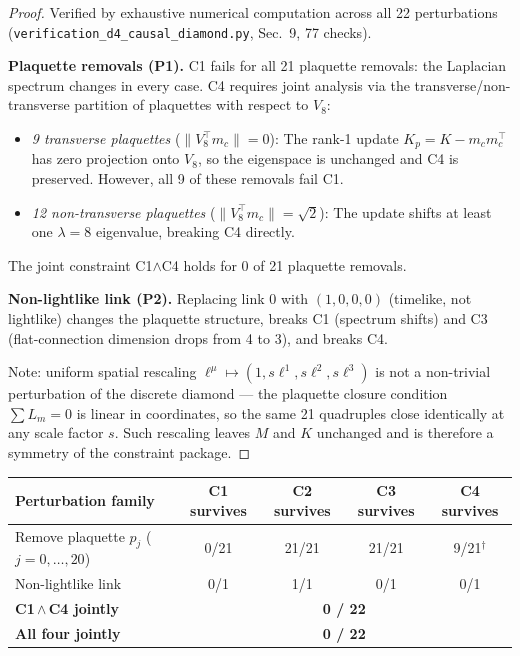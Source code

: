 \documentclass[12pt,a4paper]{article}
\theoremstyle{plain}
\theoremstyle{definition}
\begin{document}
\begin{proof}
  Verified by exhaustive numerical computation across all 22 perturbations
  (\texttt{verification\_d4\_causal\_diamond.py}, Sec.~9, 77 checks).

  \textbf{Plaquette removals (P1).}
  C1 fails for all 21 plaquette removals: the Laplacian spectrum changes in
  every case.  C4 requires joint analysis via the transverse/non-transverse
  partition of plaquettes with respect to $V_8$:
  \begin{itemize}[nosep]
    \item \emph{9 transverse plaquettes} ($\|V_8^\top m_c\| = 0$):
      The rank-1 update $K_p = K - m_c m_c^\top$ has zero projection onto
      $V_8$, so the eigenspace is unchanged and C4 is preserved.
      However, all 9 of these removals fail C1.
    \item \emph{12 non-transverse plaquettes} ($\|V_8^\top m_c\| = \sqrt{2}$):
      The update shifts at least one $\lambda=8$ eigenvalue, breaking C4
      directly.
  \end{itemize}
  The joint constraint C1$\wedge$C4 holds for 0 of 21 plaquette removals.

  \textbf{Non-lightlike link (P2).}
  Replacing link 0 with $(1,0,0,0)$ (timelike, not lightlike) changes the
  plaquette structure, breaks C1 (spectrum shifts) and C3 (flat-connection
  dimension drops from 4 to 3), and breaks C4.

  Note: uniform spatial rescaling $\ell^\mu \mapsto (1, s\ell^1, s\ell^2, s\ell^3)$
  is not a non-trivial perturbation of the discrete diamond — the plaquette
  closure condition $\sum L_m = 0$ is linear in coordinates, so the same 21
  quadruples close identically at any scale factor $s$.  Such rescaling leaves
  $M$ and $K$ unchanged and is therefore a symmetry of the constraint package.
\end{proof}

\begin{center}
\begin{tabular}{lcccc}
\toprule
Perturbation family & C1 survives & C2 survives & C3 survives & C4 survives \\
\midrule
Remove plaquette $p_j$ ($j=0,\ldots,20$) & 0/21 & 21/21 & 21/21 & 9/21$^\dagger$ \\
Non-lightlike link & 0/1 & 1/1 & 0/1 & 0/1 \\
\midrule
\textbf{C1\,$\wedge$\,C4 jointly} & \multicolumn{4}{c}{\textbf{0 / 22}} \\
\textbf{All four jointly} & \multicolumn{4}{c}{\textbf{0 / 22}} \\
\bottomrule
\end{tabular}
\end{center}
\end{document}
